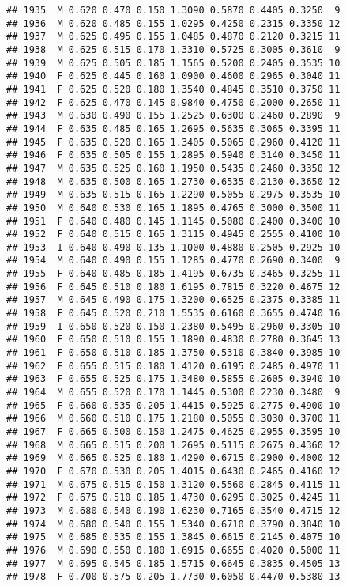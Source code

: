 \documentclass[
]{article}
\begin{document}
\begin{verbatim}
## 1935  M 0.620 0.470 0.150 1.3090 0.5870 0.4405 0.3250  9
## 1936  M 0.620 0.485 0.155 1.0295 0.4250 0.2315 0.3350 12
## 1937  M 0.625 0.495 0.155 1.0485 0.4870 0.2120 0.3215 11
## 1938  M 0.625 0.515 0.170 1.3310 0.5725 0.3005 0.3610  9
## 1939  M 0.625 0.505 0.185 1.1565 0.5200 0.2405 0.3535 10
## 1940  F 0.625 0.445 0.160 1.0900 0.4600 0.2965 0.3040 11
## 1941  F 0.625 0.520 0.180 1.3540 0.4845 0.3510 0.3750 11
## 1942  F 0.625 0.470 0.145 0.9840 0.4750 0.2000 0.2650 11
## 1943  M 0.630 0.490 0.155 1.2525 0.6300 0.2460 0.2890  9
## 1944  F 0.635 0.485 0.165 1.2695 0.5635 0.3065 0.3395 11
## 1945  F 0.635 0.520 0.165 1.3405 0.5065 0.2960 0.4120 11
## 1946  F 0.635 0.505 0.155 1.2895 0.5940 0.3140 0.3450 11
## 1947  M 0.635 0.525 0.160 1.1950 0.5435 0.2460 0.3350 12
## 1948  M 0.635 0.500 0.165 1.2730 0.6535 0.2130 0.3650 12
## 1949  M 0.635 0.515 0.165 1.2290 0.5055 0.2975 0.3535 10
## 1950  M 0.640 0.530 0.165 1.1895 0.4765 0.3000 0.3500 11
## 1951  F 0.640 0.480 0.145 1.1145 0.5080 0.2400 0.3400 10
## 1952  F 0.640 0.515 0.165 1.3115 0.4945 0.2555 0.4100 10
## 1953  I 0.640 0.490 0.135 1.1000 0.4880 0.2505 0.2925 10
## 1954  M 0.640 0.490 0.155 1.1285 0.4770 0.2690 0.3400  9
## 1955  F 0.640 0.485 0.185 1.4195 0.6735 0.3465 0.3255 11
## 1956  F 0.645 0.510 0.180 1.6195 0.7815 0.3220 0.4675 12
## 1957  M 0.645 0.490 0.175 1.3200 0.6525 0.2375 0.3385 11
## 1958  F 0.645 0.520 0.210 1.5535 0.6160 0.3655 0.4740 16
## 1959  I 0.650 0.520 0.150 1.2380 0.5495 0.2960 0.3305 10
## 1960  F 0.650 0.510 0.155 1.1890 0.4830 0.2780 0.3645 13
## 1961  F 0.650 0.510 0.185 1.3750 0.5310 0.3840 0.3985 10
## 1962  F 0.655 0.515 0.180 1.4120 0.6195 0.2485 0.4970 11
## 1963  F 0.655 0.525 0.175 1.3480 0.5855 0.2605 0.3940 10
## 1964  M 0.655 0.520 0.170 1.1445 0.5300 0.2230 0.3480  9
## 1965  F 0.660 0.535 0.205 1.4415 0.5925 0.2775 0.4900 10
## 1966  M 0.660 0.510 0.175 1.2180 0.5055 0.3030 0.3700 11
## 1967  F 0.665 0.500 0.150 1.2475 0.4625 0.2955 0.3595 10
## 1968  M 0.665 0.515 0.200 1.2695 0.5115 0.2675 0.4360 12
## 1969  M 0.665 0.525 0.180 1.4290 0.6715 0.2900 0.4000 12
## 1970  F 0.670 0.530 0.205 1.4015 0.6430 0.2465 0.4160 12
## 1971  M 0.675 0.515 0.150 1.3120 0.5560 0.2845 0.4115 11
## 1972  F 0.675 0.510 0.185 1.4730 0.6295 0.3025 0.4245 11
## 1973  M 0.680 0.540 0.190 1.6230 0.7165 0.3540 0.4715 12
## 1974  M 0.680 0.540 0.155 1.5340 0.6710 0.3790 0.3840 10
## 1975  M 0.685 0.535 0.155 1.3845 0.6615 0.2145 0.4075 10
## 1976  M 0.690 0.550 0.180 1.6915 0.6655 0.4020 0.5000 11
## 1977  M 0.695 0.545 0.185 1.5715 0.6645 0.3835 0.4505 13
## 1978  F 0.700 0.575 0.205 1.7730 0.6050 0.4470 0.5380 13

\end{verbatim}
\end{document}
